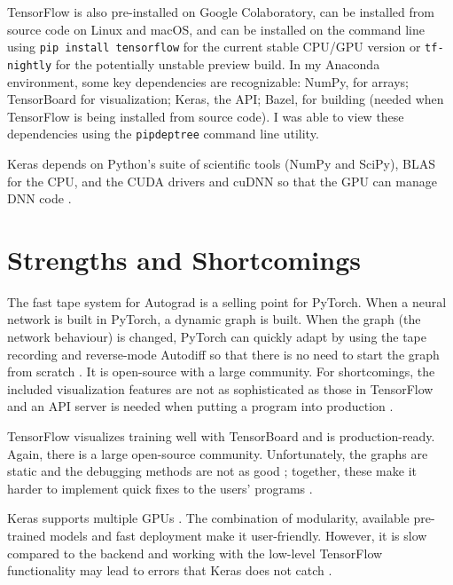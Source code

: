 \documentclass[conference]{IEEEtran}
\begin{document}
TensorFlow is also pre-installed on Google Colaboratory, can be installed from source code on Linux and macOS, and can be installed on the command line using \verb+pip install tensorflow+ for the current stable CPU/GPU version or \verb+tf-nightly+ for the potentially unstable preview build. In my Anaconda environment, some key dependencies are recognizable: NumPy, for arrays; TensorBoard for visualization; Keras, the API; Bazel, for building (needed when TensorFlow is being installed from source code). \cite{Tensorflow-Install} I was able to view these dependencies using the \verb+pipdeptree+ command line utility.

Keras depends on Python's suite of scientific tools (NumPy and SciPy), BLAS for the CPU, and the CUDA drivers and cuDNN so that the GPU can manage DNN code \cite{Sankaran}\cite{Chollet}.

\section{Strengths and Shortcomings}

The fast tape system for Autograd is a selling point for PyTorch. When a neural network is built in PyTorch, a dynamic graph is built. When the graph (the network behaviour) is changed, PyTorch can quickly adapt by using the tape recording and reverse-mode Autodiff so that there is no need to start the graph from scratch \cite{PyTorch}. It is open-source with a large community. For shortcomings, the included visualization features are not as sophisticated as those in TensorFlow \cite{Terra} and an API server is needed when putting a program into production \cite{Kurama}. 

TensorFlow visualizes training well with TensorBoard and is production-ready. Again, there is a large open-source community. Unfortunately, the graphs are static and the debugging methods are not as good \cite{Kurama}; together, these make it harder to implement quick fixes to the users' programs \cite{PyTorch}. 

Keras supports multiple GPUs \cite{Keras-GPU}. The combination of modularity, available pre-trained models and fast deployment make it user-friendly. However, it is slow compared to the backend and working with the low-level TensorFlow functionality may lead to errors that Keras does not catch \cite{DataFlair}.
\end{document}
